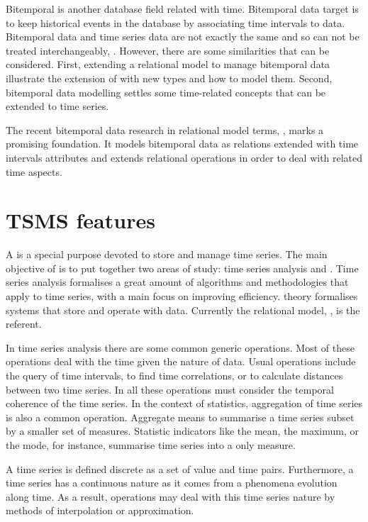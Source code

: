 Bitemporal  is another database field related with
time. Bitemporal data target is to keep historical events in the
database by associating time intervals to data.  Bitemporal data and
time series data are not exactly the same and so can not be treated
interchangeably, \cite{schmidt95}. However, there are some
similarities that can be considered. First, extending a relational
model to manage bitemporal data illustrate the extension of
 with new types and how to model them. Second, bitemporal
data modelling settles some time-related concepts that can be extended
to time series.

The recent bitemporal data research in relational  model terms,
\cite{date02:_tempor_data_relat_model}, marks a promising
foundation. It models bitemporal data as relations extended with time
intervals attributes and extends relational operations in order to
deal with related time aspects.





\section{TSMS features}
\label{sec:tsms-features}

A  is a special purpose  devoted to store and
manage time series. The main objective of  is to put
together two areas of study: time series analysis and .
Time series analysis formalises a great amount of algorithms and
methodologies that apply to time series, with a main focus on
improving efficiency.  theory formalises systems that store
and operate with data. Currently the relational model,
\cite{date:introduction}, is the referent.

In time series analysis there are some common generic operations.
Most of these operations deal with the time given the nature of data.
Usual operations include the query of time intervals, to find time
correlations, or to calculate distances between two time series. In
all these operations  must consider the temporal coherence
of the time series.  In the context of statistics, aggregation of time
series is also a common operation. Aggregate means to summarise a time
series subset by a smaller set of measures. Statistic indicators like
the mean, the maximum, or the mode, for instance, summarise time
series into a only measure.


A time series is defined discrete as a set of value and time
pairs. Furthermore, a time series has a continuous nature as it comes
from a phenomena evolution along time. As a result, 
operations may deal with this time series nature by methods of
interpolation or approximation.



